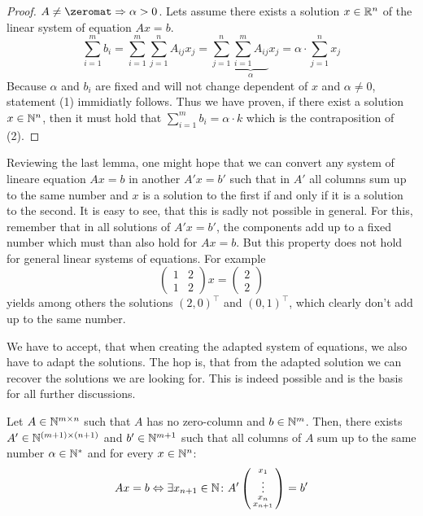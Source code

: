 \begin{proof}
    $A \neq \zeromat \Rightarrow \alpha > 0$. Lets assume there exists a solution $x \in \mathbb{R}^n$ of the linear system of equation $Ax=b$.
    $$\sum_{i=1}^m b_i = \sum_{i=1}^{m}\sum_{j=1}^{n}A_{ij} x_j = \sum_{j=1}^{n}\underbrace{\sum_{i=1}^{m}A_{ij}}_\alpha x_j = \alpha \cdot \sum_{j=1}^{n}x_j$$
    Because $\alpha$ and $b_i$ are fixed and will not change dependent of $x$ and $\alpha \neq 0$, statement (1) immidiatly follows. Thus we have proven, if there exist a solution $x \in \mathbb{N}^n$, then it must hold that $\sum_{i=1}^{m}b_i = \alpha \cdot k$ which is the contraposition of (2).
\end{proof}
Reviewing the last lemma, one might hope that we can convert any system of lineare equation $Ax = b$ in another $A'x = b'$ such that in $A'$ all columns sum up to the same number and $x$ is a solution to the first if and only if it is a solution to the second. It is easy to see, that this is sadly not possible in general. For this, remember that in all solutions of $A'x=b'$, the components add up to a fixed number which must than also hold for $Ax=b$. But this property does not hold for general linear systems of equations. For example
$$
\left(\begin{matrix}
    1 & 2\\
    1 & 2
\end{matrix}\right)
x = \left(\begin{matrix}
    2\\2
\end{matrix}\right)
$$
yields among others the solutions $(2, 0)^\top$ and $(0, 1)^\top$, which clearly don't add up to the same number. 

We have to accept, that when creating the adapted system of equations, we also have to adapt the solutions. The hop is, that from the adapted solution we can recover the solutions we are looking for. This is indeed possible and is the basis for all further discussions.

\begin{theorem}
    Let $A\in \mathbb{N}^{m \times n}$ such that $A$ has no zero-column and $b \in \mathbb{N}^m$. Then, there exists $A' \in \mathbb{N}^{(m+1) \times (n+1)}$ and $b' \in \mathbb{N}^{m+1}$ such that all columns of $A$ sum up to the same number $\alpha \in \mathbb{N}^*$ and for every $x \in \mathbb{N}^n$:
    $$Ax = b \Leftrightarrow \exists x_{n+1}\in \mathbb{N}\colon A' \left(\begin{smallmatrix}
        x_1\\
        \vdots\\
        x_n\\
        x_{n+1}
    \end{smallmatrix}\right) = b'$$
\end{theorem}

